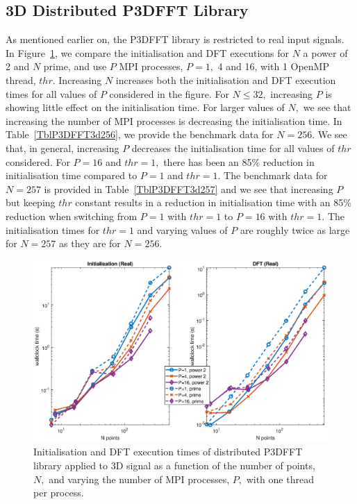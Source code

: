 \documentclass[a4paper]{article}
\begin{document}
\subsection{3D Distributed P3DFFT Library}\label{Sec:3DDistP3DFFT}

As mentioned earlier on, the P3DFFT library is restricted to real
input signals. In Figure~\ref{3DDistP3DFFT}, we compare the
initialisation and DFT executions for $N$ a power of 2 and $N$ prime,
and use $P$ MPI processes, $P=1,$ 4 and 16, with 1 OpenMP thread,
$thr.$ Increasing $N$ increases both the initialisation and DFT
execution times for all values of $P$ considered in the figure. For
$N\le 32,$ increasing $P$ is showing little effect on the
initialisation time. For larger values of $N,$ we see that increasing
the number of MPI processes is decreasing the initialisation time. In
Table~\ref{TblP3DFFT3d256}, we provide the benchmark data for
$N=256.$ We see that, in general, increasing $P$ decreases the
initialisation time for all values of $thr$ considered. For $P=16$ and
$thr=1,$ there has been an 85\% reduction in initialisation time
compared to $P=1$ and $thr=1.$ The benchmark data for $N=257$ is
provided in Table~\ref{TblP3DFFT3d257} and we see that increasing $P$
but keeping $thr$ constant results in a reduction in initialisation
time with an 85\% reduction when switching from $P=1$ with $thr=1$ to
$P=16$ with $thr=1.$ The initialisation times for $thr=1$ and varying
values of $P$ are roughly twice as large for $N=257$ as they are for
$N=256.$

\begin{figure}[htb]
    \centering
    \includegraphics[width=0.9\linewidth]{../results/p3dfft_3d_mpi.eps}
  \caption{Initialisation and DFT execution times of distributed P3DFFT library applied to 3D signal as a function of the
    number of points, $N,$ and varying the number of MPI processes, $P,$ with one thread per process.}
  \label{3DDistP3DFFT}
\end{figure}
\end{document}
